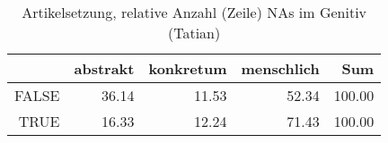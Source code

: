 \begin{table}[ht]
\centering
\begin{tabular}{rrrrr}
  \hline
 & abstrakt & konkretum & menschlich & Sum \\ 
  \hline
FALSE & 36.14 & 11.53 & 52.34 & 100.00 \\ 
  TRUE & 16.33 & 12.24 & 71.43 & 100.00 \\ 
   \hline
\end{tabular}
\caption{Artikelsetzung, relative Anzahl (Zeile) NAs im Genitiv (Tatian)} 
\end{table}
